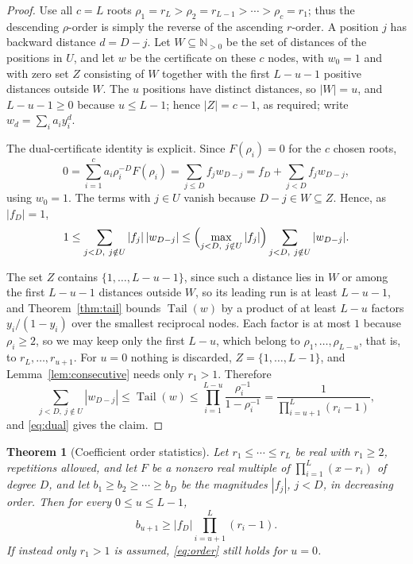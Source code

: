 \documentclass[11pt]{article}
\newtheorem{theorem}{Theorem}[section]
\newcommand{\N}{\mathbb N}
\DeclareMathOperator{\Tail}{Tail}
\begin{document}
\begin{proof}
Use all $c=L$ roots $\rho_1=r_L>\rho_2=r_{L-1}>\cdots>\rho_c=r_1$; thus the
descending $\rho$-order is simply the reverse of the ascending $r$-order.  A
position $j$ has backward distance $d=D-j$.  Let $W\subseteq\N_{>0}$ be the
set of distances of the positions in $U$, and let $w$ be the certificate on
these $c$ nodes, with $w_0=1$ and with zero set $Z$ consisting of $W$
together with the first $L-u-1$ positive distances outside $W$.  The $u$
positions have distinct distances, so $|W|=u$, and $L-u-1\ge0$ because
$u\le L-1$; hence $|Z|=c-1$, as required; write $w_d=\sum_i a_iy_i^d$.

The dual-certificate identity is explicit.  Since $F(\rho_i)=0$ for the $c$
chosen roots,
\[
  0=\sum_{i=1}^c a_i\rho_i^{-D}F(\rho_i)
   =\sum_{j\le D}f_jw_{D-j}
   =f_D+\sum_{j<D}f_jw_{D-j},
\]
using $w_0=1$.  The terms with $j\in U$ vanish because $D-j\in W\subseteq Z$.
Hence, as $|f_D|=1$,
\begin{equation}\label{eq:dual}
  1\le\sum_{j<D,\ j\notin U}|f_j|\,|w_{D-j}|
  \le\Bigl(\max_{j<D,\ j\notin U}|f_j|\Bigr)
        \sum_{j<D,\ j\notin U}|w_{D-j}|.
\end{equation}

The set $Z$ contains $\{1,\ldots,L-u-1\}$, since such a distance lies in $W$
or among the first $L-u-1$ distances outside $W$, so its leading run is at least
$L-u-1$, and Theorem~\ref{thm:tail} bounds $\Tail(w)$ by a product of at
least $L-u$ factors $y_i/(1-y_i)$ over the smallest reciprocal nodes.  Each
factor is at most $1$ because $\rho_i\ge2$, so we may keep only the first
$L-u$, which belong to $\rho_1,\ldots,\rho_{L-u}$, that is, to
$r_L,\ldots,r_{u+1}$.  For $u=0$ nothing is discarded, $Z=\{1,\ldots,L-1\}$,
and Lemma~\ref{lem:consecutive} needs only $r_1>1$.  Therefore
\[
  \sum_{j<D,\ j\notin U}|w_{D-j}|
  \le\Tail(w)
  \le\prod_{i=1}^{L-u}\frac{\rho_i^{-1}}{1-\rho_i^{-1}}
  =\frac{1}{\prod_{i=u+1}^L(r_i-1)},
\]
and \eqref{eq:dual} gives the claim.
\end{proof}

\begin{theorem}[Coefficient order statistics]\label{thm:order}
Let $r_1\le\cdots\le r_L$ be real with $r_1\ge2$, repetitions allowed, and
let $F$ be a nonzero real multiple of $\prod_{i=1}^L(x-r_i)$ of degree $D$,
and let $b_1\ge b_2\ge\cdots\ge b_D$ be the magnitudes $|f_j|$, $j<D$, in
decreasing order.  Then for every $0\le u\le L-1$,
\begin{equation}\label{eq:order}
  b_{u+1}\ge|f_D|\prod_{i=u+1}^L(r_i-1).
\end{equation}
If instead only $r_1>1$ is assumed, \eqref{eq:order} still holds for $u=0$.
\end{theorem}
\end{document}

